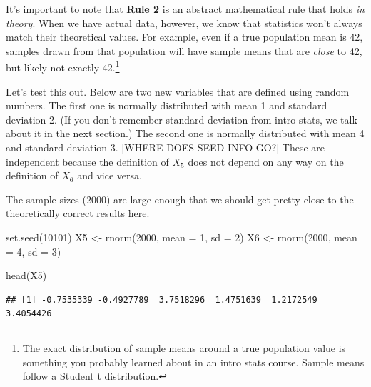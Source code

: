 \documentclass[
]{book}
\newenvironment{Shaded}{\begin{snugshade}}{\end{snugshade}}
\newcommand{\AttributeTok}[1]{\textcolor[rgb]{0.77,0.63,0.00}{#1}}
\newcommand{\DecValTok}[1]{\textcolor[rgb]{0.00,0.00,0.81}{#1}}
\newcommand{\FunctionTok}[1]{\textcolor[rgb]{0.00,0.00,0.00}{#1}}
\newcommand{\NormalTok}[1]{#1}
\newcommand{\OtherTok}[1]{\textcolor[rgb]{0.56,0.35,0.01}{#1}}
\begin{document}
It's important to note that \protect\hyperlink{Rule2}{\textbf{Rule 2}} is an abstract mathematical rule that holds \emph{in theory}. When we have actual data, however, we know that statistics won't always match their theoretical values. For example, even if a true population mean is 42, samples drawn from that population will have sample means that are \emph{close} to 42, but likely not exactly 42.\footnote{The exact distribution of sample means around a true population value is something you probably learned about in an intro stats course. Sample means follow a Student t distribution.}

Let's test this out. Below are two new variables that are defined using random numbers. The first one is normally distributed with mean 1 and standard deviation 2. (If you don't remember standard deviation from intro stats, we talk about it in the next section.) The second one is normally distributed with mean 4 and standard deviation 3. {[}WHERE DOES SEED INFO GO?{]} These are independent because the definition of \(X_{5}\) does not depend on any way on the definition of \(X_{6}\) and vice versa.

The sample sizes (2000) are large enough that we should get pretty close to the theoretically correct results here.

\begin{Shaded}
\begin{Highlighting}[]
\FunctionTok{set.seed}\NormalTok{(}\DecValTok{10101}\NormalTok{)}
\NormalTok{X5 }\OtherTok{\textless{}{-}} \FunctionTok{rnorm}\NormalTok{(}\DecValTok{2000}\NormalTok{, }\AttributeTok{mean =} \DecValTok{1}\NormalTok{, }\AttributeTok{sd =} \DecValTok{2}\NormalTok{)}
\NormalTok{X6 }\OtherTok{\textless{}{-}} \FunctionTok{rnorm}\NormalTok{(}\DecValTok{2000}\NormalTok{, }\AttributeTok{mean =} \DecValTok{4}\NormalTok{, }\AttributeTok{sd =} \DecValTok{3}\NormalTok{)}
\end{Highlighting}
\end{Shaded}

\begin{Shaded}
\begin{Highlighting}[]
\FunctionTok{head}\NormalTok{(X5)}
\end{Highlighting}
\end{Shaded}

\begin{verbatim}
## [1] -0.7535339 -0.4927789  3.7518296  1.4751639  1.2172549  3.4054426
\end{verbatim}
\end{document}
